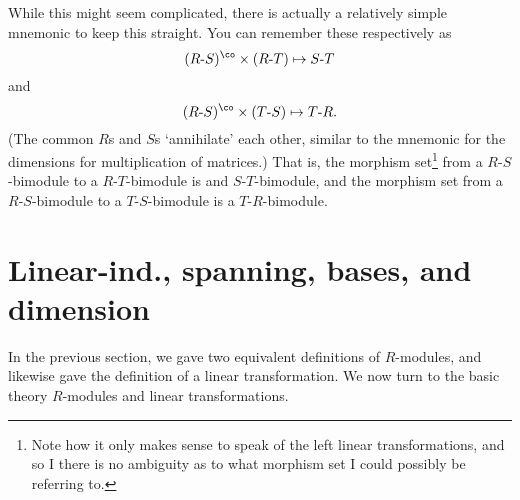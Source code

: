 While this might seem complicated, there is actually a relatively simple mnemonic to keep this straight.  You can remember these respectively as
\begin{equation}
(R\text{-}S)^{\co}\times (R\text{-}T)\mapsto S\text{-}T
\end{equation}
and
\begin{equation}
(R\text{-}S)^{\co}\times (T\text{-}S)\mapsto T\text{-}R.
\end{equation}
(The common $R$s and $S$s `annihilate' each other, similar to the mnemonic for the dimensions for multiplication of matrices.)  That is, the morphism set\footnote{Note how it only makes sense to speak of the left linear transformations, and so I there is no ambiguity as to what morphism set I could possibly be referring to.} from a $R$-$S$-bimodule to a $R$-$T$-bimodule is and $S$-$T$-bimodule, and the morphism set from a $R$-$S$-bimodule to a $T$-$S$-bimodule is a $T$-$R$-bimodule.

\section{Linear-ind., spanning, bases, and dimension}

In the previous section, we gave two equivalent definitions of $R$-modules, and likewise gave the definition of a linear transformation.  We now turn to the basic theory $R$-modules and linear transformations.

